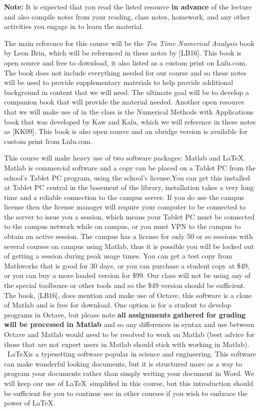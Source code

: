 \documentclass[twoside]{article}
\renewcommand{\cite}[1]{[#1]}
\begin{document}
{\bf Note:} {\color{teal} It is expected that you read the listed resource {\bf  in advance} of the lecture and also compile notes from your reading, class notes, homework, and any other activities you engage in to learn the material. }
\medskip \par
The main reference for this course will be the {\it Tea Time Numerical Analysis} book by Leon Brin, which will be referenced in these notes by \cite{LB16}. This book is open source and free to download, it also listed as a custom print on Lulu.com. The book does not include everything needed for our course and so these notes will be used to provide supplementary materials to help provide additional background in content that we will need. The ultimate goal will be to develop a companion book that will provide the material needed. Another open resource that we will make use of in the class is the Numerical Methods with Applications book that  was developed by Kaw and Kalu, which we will reference in these notes as \cite{KK09}. This book is also open source and an abridge version is available for custom print from Lulu.com. 
\medskip \par 
This course will make heavy use of two software packages: Matlab and LaTeX. Matlab is commercial software and a copy can be placed on a Tablet PC from the school's Tablet PC program, using the school's license.You can get this installed at Tablet PC central  in the basement of the library, installation takes a very long time and a reliable connection to the campus server. If you do use the campus license then the license manager will require your computer to be connected to the server to issue you a session, which means your Tablet PC must be connected to the campus network while on campus, or you must VPN to the campus to obtain an active session. The campus has a license for only 50 or so sessions with several courses on campus using Matlab, thus it is possible you will be locked out of getting a session during peak usage times.  You can get a test copy from Mathworks that is good for 30 days, or you can purchase a student copy at \$49, or you can buy a more loaded version for \$99. Our class will not be using any of the special toolboxes or other tools and so the \$49 version should be sufficient. The book, \cite{LB16}, does mention and make use of Octave, this software is a clone of Matlab and is free for download. One option is for a student to develop programs in Octave, but please note {\bf all assignments gathered for grading will be processed in Matlab} and so any differences in syntax and use between Octave and Matlab would need to be resolved to work on Matlab (best advice for those that are not expert users in Matlab should stick with working in Matlab). \ \LaTeX  is a typesetting software popular in science and engineering. This software can make wonderful looking documents, but it is structured more as a way to program your documents rather than simply writing your document in Word. We will keep our use of \LaTeX \ simplified in this course, but this introduction should be sufficient for you to continue use in other courses if you wish to embrace the power of \LaTeX.  \medskip \par
\end{document}
